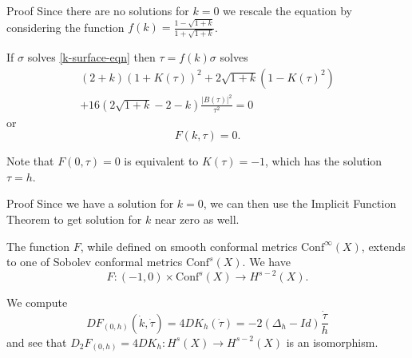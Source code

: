 \documentclass[professionalfont]{beamer}
\begin{document}


\begin{frame}{Proof}
Since there are no solutions for $k = 0$ we rescale the equation by considering the function $f(k) = \frac{1-\sqrt{1+k}}{1+\sqrt{1+k}}$. 
\newline \pause



If $\sigma$ solves \eqref{k-surface-eqn} then $\tau = f(k)\sigma$ solves 
\begin{multline*}
(2+k)(1+K(\tau))^2 + 2\sqrt{1+k}\left(1-K(\tau)^2 \right) \\ +16\left(2\sqrt{1+k} - 2 - k  \right)\frac{|B(\tau)|^2}{\tau^2} = 0
\end{multline*}or 
\[
F(k,\tau) = 0.
\]\pause


Note that $F(0,\tau) = 0$ is equivalent to $K(\tau) = -1$, which has the solution $\tau = h$. 
\end{frame}




\begin{frame}{Proof}
Since we have a solution for $k = 0$, we can then use the Implicit Function Theorem to get solution for $k$ near zero as well. 
\newline

The function $F$, while defined on smooth conformal metrics $\mathrm{Conf}^\infty(X)$, extends to one of Sobolev conformal metrics $\mathrm{Conf}^s(X)$. We have 
\[
F: (-1,0) \times \mathrm{Conf}^s(X) \to H^{s-2}(X).
\] \pause

We compute
\[
DF_{(0,h)}(\dot{k},\dot{\tau}) = 4D K_h(\dot{\tau}) =-2(\Delta_h - Id)\frac{\dot{\tau}}{h}
\]
and see that $D_2F_{(0,h)} = 4D K_h: H^s(X) \to H^{s-2}(X)$ is an isomorphism.
\newline

\end{frame}


\end{document}
